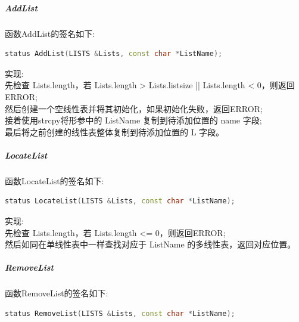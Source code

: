 \documentclass[supercite]{Experimental_Report}
\theoremstyle{definition}
\begin{document}
\subparagraph{AddList}
\noindent
函数AddList的签名如下:
\begin{lstlisting}[language=C++, frame=single]
status AddList(LISTS &Lists, const char *ListName);
\end{lstlisting}

\noindent
实现: \\
先检查 Lists.length，若 Lists.length > Lists.listsize || Lists.length < 0，则返回ERROR; \\
然后创建一个空线性表并将其初始化，如果初始化失败，返回ERROR; \\
接着使用strcpy将形参中的 ListName 复制到待添加位置的 name 字段; \\
最后将之前创建的线性表整体复制到待添加位置的 L 字段。\\

\subparagraph{LocateList}
\noindent
函数LocateList的签名如下:
\begin{lstlisting}[language=C++, frame=single]
status LocateList(LISTS &Lists, const char *ListName);
\end{lstlisting}

\noindent
实现: \\
先检查 Lists.length，若 Lists.length <= 0，则返回ERROR; \\
然后如同在单线性表中一样查找对应于 ListName 的多线性表，返回对应位置。\\

\subparagraph{RemoveList}
\noindent
函数RemoveList的签名如下:
\begin{lstlisting}[language=C++, frame=single]
status RemoveList(LISTS &Lists, const char *ListName);
\end{lstlisting}
\end{document}

